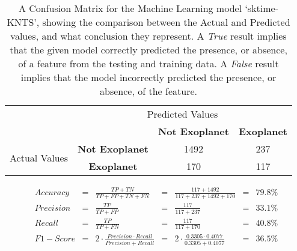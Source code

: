 
    \renewcommand{\arraystretch}{2}
    \renewcommand{\tabcolsep}{20.25pt}
    \vspace{-0.5cm}
    \begin{table}[ht]
    \begin{tabular}{cccc}
     & \multicolumn{3}{c}{Predicted Values} \\ \cline{3-4}
     & \multicolumn{1}{c|}{} & \multicolumn{1}{c|}{\textbf{Not Exoplanet}} & \multicolumn{1}{c|}{\textbf{Exoplanet}} \\ \cline{2-4}
    \multicolumn{1}{c|}{\multirow{2}{2.0cm}{Actual Values}} & \multicolumn{1}{c|}{\textbf{Not Exoplanet}} & \multicolumn{1}{c|}{1492} & \multicolumn{1}{c|}{237} \\ \cline{2-4}
    \multicolumn{1}{c|}{} & \multicolumn{1}{c|}{\textbf{Exoplanet}} & \multicolumn{1}{c|}{170} & \multicolumn{1}{c|}{117} \\ \cline{2-4}
    \end{tabular}
    \caption{A Confusion Matrix for the Machine Learning model `sktime-KNTS', showing the comparison between the Actual and Predicted values, and what conclusion they represent. A \emph{True} result implies that the given model correctly predicted the presence, or absence, of a feature from the testing and training data. A \emph{False} result implies that the model incorrectly predicted the presence, or absence, of the feature.}
    \label{tab:sktime-KNTSconfusionmatrix}
    \end{table}
    \vspace{-0.75cm}
    \label{eq:metrics-sktime-KNTS}
    \begin{align*}
        Accuracy &= &\frac{TP + TN}{TP + FP + TN + FN} &= &\frac{117 + 1492}{117 + 237 + 1492 + 170} &= & 79.8\% \\
        Precision &= &\frac{TP}{TP + FP} &= &\frac{117}{117 + 237} &= & 33.1\% \\
        Recall &= &\frac{TP}{TP + FN} &= &\frac{117}{117 + 170} &= & 40.8\% \\
        F1-Score &= &2 \cdot \frac{Precision \cdot Recall}{Precision + Recall} &= &2 \cdot \frac{0.3305 \cdot 0.4077}{0.3305 + 0.4077} &= & 36.5\% \\
    \end{align*}
    \vspace{-1.75cm}
    \renewcommand{\arraystretch}{1}
    \renewcommand{\tabcolsep}{5.25pt}
    